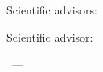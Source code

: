 %
\vspace{0pt plus4fill} %
\begin{flushright}
\ifdefined\supervisorTwoFio
Scientific advisors:

\supervisorRegaliaEn

\ifdefined\supervisorDead
\framebox{\supervisorFioEn}
\else
\supervisorFioEn
\fi

\supervisorTwoRegalia

\ifdefined\supervisorTwoDead
\framebox{\supervisorTwoFio}
\else
\supervisorTwoFio
\fi
\else
Scientific advisor:

\supervisorRegaliaEn

\ifdefined\supervisorDead
\framebox{\supervisorFioEn}
\else
\supervisorFioEn
\fi
\fi

\end{flushright}
%
\vspace{0pt plus4fill} %
{\centering\thesisCityEn\ --- \thesisYear\par}
